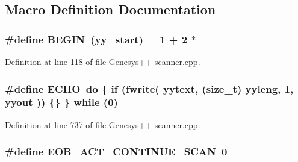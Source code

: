 \subsection{Macro Definition Documentation}
\hypertarget{_genesys_09_09-scanner_8cpp_ab766bbbee08d04b67e3fe599d6900873}{
\subsubsection[{B\-E\-G\-I\-N}]{\setlength{\rightskip}{0pt plus 5cm}\#define B\-E\-G\-I\-N~({\bf yy\-\_\-start}) = 1 + 2 $\ast$}}\label{_genesys_09_09-scanner_8cpp_ab766bbbee08d04b67e3fe599d6900873}


Definition at line 118 of file Genesys++-\/scanner.\-cpp.

\hypertarget{_genesys_09_09-scanner_8cpp_aad1dc60a04a1d8cfc8b3ded13601e361}{
\subsubsection[{E\-C\-H\-O}]{\setlength{\rightskip}{0pt plus 5cm}\#define E\-C\-H\-O~do \{ {\bf if} (fwrite( {\bf yytext}, (size\-\_\-t) {\bf yyleng}, 1, {\bf yyout} )) \{\} \} {\bf while} (0)}}\label{_genesys_09_09-scanner_8cpp_aad1dc60a04a1d8cfc8b3ded13601e361}


Definition at line 737 of file Genesys++-\/scanner.\-cpp.

\hypertarget{_genesys_09_09-scanner_8cpp_adf4b0db227e07782e28ade353a7ba7a1}{
\subsubsection[{E\-O\-B\-\_\-\-A\-C\-T\-\_\-\-C\-O\-N\-T\-I\-N\-U\-E\-\_\-\-S\-C\-A\-N}]{\setlength{\rightskip}{0pt plus 5cm}\#define E\-O\-B\-\_\-\-A\-C\-T\-\_\-\-C\-O\-N\-T\-I\-N\-U\-E\-\_\-\-S\-C\-A\-N~0}}\label{_genesys_09_09-scanner_8cpp_adf4b0db227e07782e28ade353a7ba7a1}


